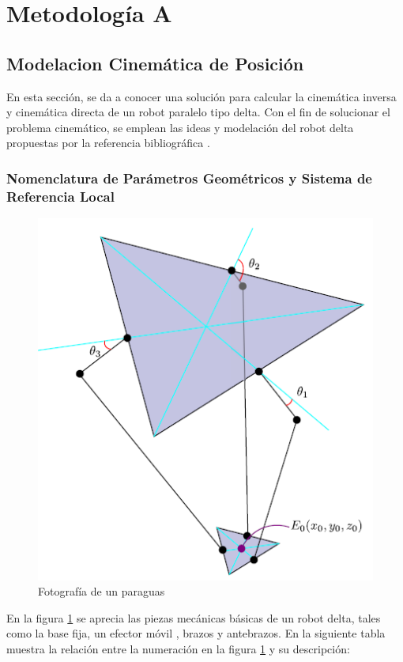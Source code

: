      \newpage

\section{Metodología A}

    \subsection{Modelacion Cinemática de Posición}
    
        En esta sección, se da a conocer una solución para calcular la cinemática inversa y cinemática directa de un robot paralelo tipo delta. Con el fin de solucionar el problema cinemático, se emplean las ideas y modelación del robot delta propuestas por la referencia bibliográfica \cite{Diseno_e_implementacion_de_un_sistema_de_control_para_la_representacion_grafica_a_partir_de_imagenes}.
        
        \subsubsection{Nomenclatura de Parámetros Geométricos y Sistema de Referencia Local}

        \begin{figure}[htb]
             \centering
             \includegraphics[width=0.5\linewidth]{Main/Chapter4/Images4/Metodo_A_Modelacion_Cinematica_Posicion_1.png}
              \caption{Fotografía de un paraguas}
              \label{f:Cap4_Metodo_A_Modelacion_Cinematica_Posicion_1}
        \end{figure}

 

        En la figura \ref{f:Cap4_Metodo_A_Modelacion_Cinematica_Posicion_1} se aprecia las piezas mecánicas básicas de un robot delta, tales como la  base fija, un efector móvil , brazos y antebrazos. En la siguiente tabla muestra la relación entre la numeración en la figura \ref{f:Cap4_Metodo_A_Modelacion_Cinematica_Posicion_1} y su descripción:
        
